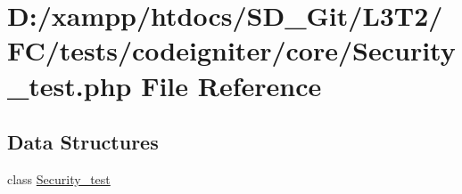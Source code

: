 \hypertarget{_security__test_8php}{}\section{D\+:/xampp/htdocs/\+S\+D\+\_\+\+Git/\+L3\+T2/\+F\+C/tests/codeigniter/core/\+Security\+\_\+test.php File Reference}
\label{_security__test_8php}
\subsection*{Data Structures}
\begin{DoxyCompactItemize}
\item 
class \hyperlink{class_security__test}{Security\+\_\+test}
\end{DoxyCompactItemize}
